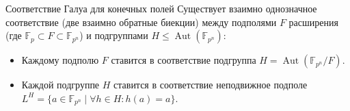 \begin{Statement}{Соответствие Галуа для конечных полей}{}
	Существует взаимно однозначное соответствие (две взаимно обратные биекции) между подполями $F$ расширения (где $\mathbb{F}_p \subset F \subset \mathbb{F}_{p^n}$) и подгруппами $H \le \operatorname{Aut}(\mathbb{F}_{p^n})$:
	\begin{itemize}
		\item Каждому подполю $F$ ставится в соответствие подгруппа $H = \operatorname{Aut}(\mathbb{F}_{p^n}/F)$.
		\item Каждой подгруппе $H$ ставится в соответствие неподвижное подполе $L^H = \{ a \in \mathbb{F}_{p^n} \mid \forall h \in H : h(a) = a \}$.
	\end{itemize}
\end{Statement}
